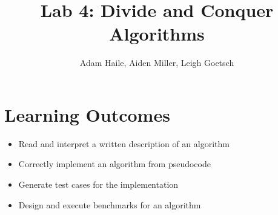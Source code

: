 \documentclass{labReport}
\title{Lab 4: Divide and Conquer Algorithms}
\author{Adam Haile, Aiden Miller, Leigh Goetsch}
\begin{document}
\maketitle

\section*{Learning Outcomes}
\begin{itemize}
    \item Read and interpret a written description of an algorithm
    \item Correctly implement an algorithm from pseudocode
    \item Generate test cases for the implementation
    \item Design and execute benchmarks for an algorithm
\end{itemize}


\newpage
\end{document}
